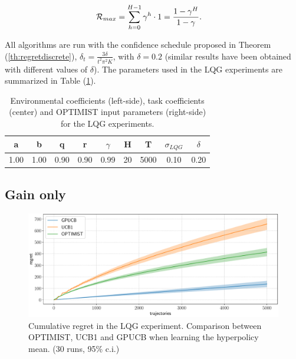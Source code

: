 \begin{align}
\mathcal{R}_{max}
&= \sum_{h=0}^{H-1}\gamma^h\cdot 1 = \frac{1-\gamma^H}{1-\gamma}.
\end{align}
 
All algorithms are run with the confidence schedule proposed in Theorem (\ref{th:regretdiscrete}), \ie $\delta_t = \frac{3\delta}{t^2\pi^2K}$, with $\delta=0.2$ (similar results have been obtained with different values of $\delta$). The parameters used in the \gls{LQG} experiments are summarized in Table (\ref{tab:LQGcoeff}).


\begin{table}[t!]
\centering
\begin{tabular}{cccc|cccc|c} 
\toprule
a & b & q & r & $\gamma$ & H & T & $\sigma_{LQG}$ & $\delta$\\ 
\midrule
1.00 & 1.00 & 0.90 & 0.90 & 0.99 & 20 & 5000 & 0.10 & 0.20\\
\bottomrule
\end{tabular}
\caption{Environmental coefficients (left-side), task coefficients (center) and \gls{OPTIMIST} input parameters (right-side) for the \gls{LQG} experiments.}
\label{tab:LQGcoeff}
\end{table}


\subsection{Gain only}

\begin{figure}[t!]
\centering
\includegraphics[width=\textwidth,height=\textheight,keepaspectratio]{Images/LQGcomparison.pdf}
\caption{Cumulative regret in
the \gls{LQG} experiment. Comparison between
\gls{OPTIMIST}, \gls{UCB}1 and \gls{GPUCB} when learning the hyperpolicy mean.
(30 runs, 95\% c.i.)}
\label{fig:LQGcomparison}
\end{figure}

